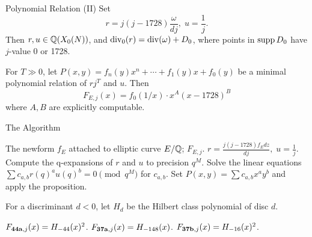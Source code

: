 \documentclass[handout]{beamer}
\begin{document}
\begin{frame}{Polynomial Relation (II)}
Set \[
r = j(j-1728)  \frac{\omega }{{d j}}, \;  u = \frac{1}{j}.
\]
Then $r, u \in \mathbb{Q}(X_0(N))$, and $\operatorname{div}_0(r)  = \operatorname{div}(\omega) + D_0$, where points in $\operatorname{supp} D_0$ have $j$-value 0 or 1728.  \\

\smallskip 

\pause


\begin{Prop}[C.]
For $T \gg 0$, let $P(x,y) = f_n(y)x^n + \cdots + f_1(y)x + f_0(y)$ be a minimal polynomial relation of $rj^T$ and $u$. Then
\[
		F_{E,j}(x) = f_0(1/x) \cdot x^{A} (x - 1728)^B
\]	
where $A,B$ are explicitly computable. 
\end{Prop}

\end{frame}

\begin{frame}{The Algorithm}

\begin{algorithm}[H]
\begin{algorithmic}[[1]
\Require The newform $f_E$ attached to elliptic curve $E/\mathbb{Q}$; 
\Ensure $F_{E,j}$.  
\State $r = \frac{j(j-1728) f_E  dz }{dj}, \;  u = \frac{1}{j}$. 
\State Compute the q-expansions of $r$ and $u$ to precision $q^M$. 
\State Solve the linear equations $\sum c_{a,b}r(q)^au(q)^b = 0 \pmod {q^M} $ for $c_{a,b}$. 
\State Set $P(x,y) = \sum c_{a,b}x^ay^b$ and apply the proposition. 
\end{algorithmic}
\end{algorithm}

For a discriminant $d< 0$, let $H_d$ be the Hilbert class polynomial of disc $d$. 
\begin{Example}
$F_{{\bf 44a},j}(x) = H_{-44}(x)^2$. $F_{{\bf 37a},j}(x) = H_{-148}(x)$. $F_{{\bf 37b},j}(x) = H_{-16}(x)^2$.
\end{Example}


\end{frame}
\end{document}
